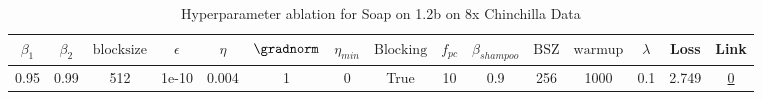 \begin{table}[H]
\centering
\caption{Hyperparameter ablation for Soap on 1.2b on 8x Chinchilla Data}
\label{tab:ablation_soap_1.2b_on_8x_chinchilla_data}
\begin{tabular}{ccccccccccccccc}
\toprule
$\beta_1$ & $\beta_2$ & $\mathrm{block size}$ & $\epsilon$ & $\eta$ & $\gradnorm$ & $\eta_{min}$ & $\mathrm{Blocking}$ & $f_{pc}$ & $\beta_{shampoo}$ & $\mathrm{BSZ}$ & $\mathrm{warmup}$ & $\lambda$ & Loss & Link \\
\midrule
0.95 & 0.99 & 512 & 1e-10 & 0.004 & 1 & 0 & True & 10 & 0.9 & 256 & 1000 & 0.1 & 2.749 & \href{https://wandb.ai/stanford-mercury/optimizer-scaling/runs/sweep-1.2b-193B-soapeweightf32ebf088lr0.004-wd0.1-minlr0.0-warmu-029405}{0} \\
\midrule
\bottomrule
\end{tabular}
\end{table}

